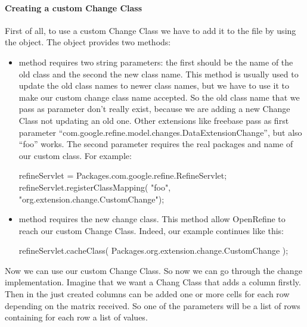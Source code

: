\paragraph{Creating a custom Change Class}
First of all, to use a custom Change Class we have to add it to the  file by using the  object. The  object provides two methods:
\begin{itemize}
	\item {} method requires two string parameters: the first should be the name of the old class and the second the new class name. This method is usually used to update the old class names to newer class names, but we have to use it to make our custom change class name accepted. So the old class name that we pass as parameter don't really exist, because we are adding a new Change Class not updating an old one. Other extensions like freebase pass as first parameter ``com.google.refine.model.changes.DataExtensionChange'', but also ``foo'' works. The second parameter requires the real packages and name of our custom class. For example:
	\begin{code}
refineServlet = Packages.com.google.refine.RefineServlet;
refineServlet.registerClassMapping(
   "foo", "org.extension.change.CustomChange");
	\end{code}
	\item {} method requires the new change class. This method allow OpenRefine to reach our custom Change Class. Indeed, our example continues like this:
	\begin{code}
refineServlet.cacheClass(
Packages.org.extension.change.CustomChange
);
	\end{code}
\end{itemize}
Now we can use our custom Change Class. So now we can go through the change implementation.
Imagine that we want a Chang Class that adds a column firstly. Then in the just created columns can be added one or more cells for each row depending on the matrix received. So one of the parameters will be a list of rows containing for each row a list of values.
